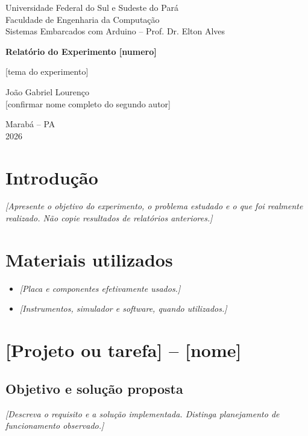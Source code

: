 \documentclass[12pt,a4paper]{article}
\newcommand{\NumeroExperimento}{[numero]}
\newcommand{\TemaExperimento}{[tema do experimento]}
\newcommand{\AutorUm}{João Gabriel Lourenço}
\newcommand{\AutorDois}{[confirmar nome completo do segundo autor]}
\newcommand{\Cidade}{Marabá -- PA}
\newcommand{\AnoRelatorio}{2026}
\begin{document}
\begin{titlepage}
  \begin{center}
    Universidade Federal do Sul e Sudeste do Pará\\[0.5cm]
    Faculdade de Engenharia da Computação\\[0.5cm]
    Sistemas Embarcados com Arduino -- Prof. Dr. Elton Alves

    \vfill
    {\LARGE\bfseries Relatório do Experimento \NumeroExperimento\par}
    \vspace{0.7cm}
    {\Large \TemaExperimento\par}

    \vfill
    \AutorUm\\[0.4cm]
    \AutorDois

    \vfill
    \Cidade\\[0.4cm]
    \AnoRelatorio
  \end{center}
\end{titlepage}

\setcounter{page}{1}

\section{Introdução}
\textit{[Apresente o objetivo do experimento, o problema estudado e o que foi realmente realizado. Não copie resultados de relatórios anteriores.]}

\section{Materiais utilizados}
\begin{itemize}
  \item \textit{[Placa e componentes efetivamente usados.]}
  \item \textit{[Instrumentos, simulador e software, quando utilizados.]}
\end{itemize}

\section{[Projeto ou tarefa] -- [nome]}

\subsection{Objetivo e solução proposta}
\textit{[Descreva o requisito e a solução implementada. Distinga planejamento de funcionamento observado.]}
\end{document}
